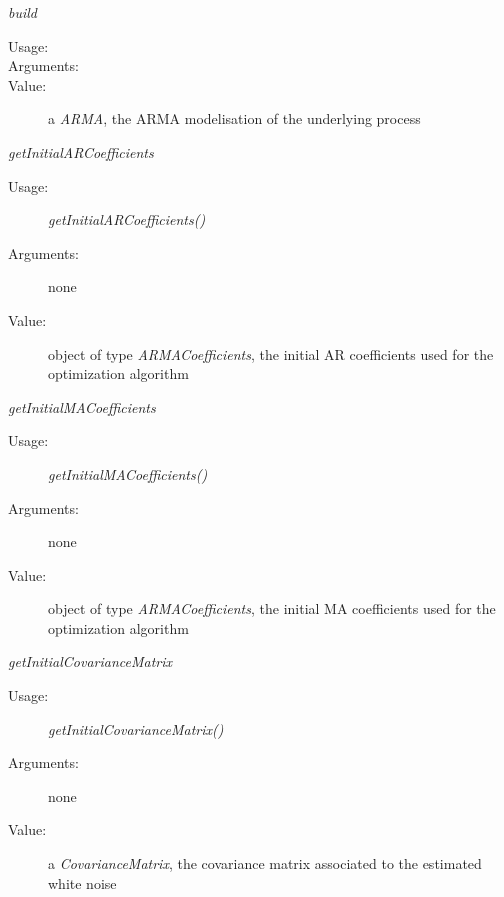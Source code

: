 \begin{description}
\begin{description}
\item \textit{build}
\begin{description}
\item[Usage:] \rule{0pt}{1em}
\item[Arguments:] \rule{0pt}{1em}
\item[Value:]   a \textit{ARMA}, the ARMA modelisation of the underlying process
\end{description}
\bigskip

\item \textit{getInitialARCoefficients}
\begin{description}
\item[Usage:] \textit{getInitialARCoefficients()}
\item[Arguments:] none
\item[Value:]  object of type \textit{ARMACoefficients}, the initial AR coefficients used for the optimization algorithm
\end{description}

\item \textit{getInitialMACoefficients}
\begin{description}
\item[Usage:] \textit{getInitialMACoefficients()}
\item[Arguments:] none
\item[Value:]  object of type \textit{ARMACoefficients}, the initial MA coefficients used for the optimization algorithm
\end{description}

\item \textit{getInitialCovarianceMatrix}
\begin{description}
\item[Usage:] \textit{getInitialCovarianceMatrix()}
\item[Arguments:] none
\item[Value:]  a \textit{CovarianceMatrix}, the covariance matrix associated to the estimated white noise
\end{description}



\end{description}
\end{description}
